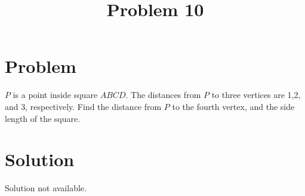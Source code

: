\documentclass{article}
\title{Problem 10}
\date{}
\begin{document}
\maketitle

\section*{Problem}
\(P\) is a point inside square \(A B C D\). The distances from \(P\) to three vertices are 1,2, and 3, respectively. Find the distance from \(P\) to the fourth vertex, and the side length of the square.

\section*{Solution}
Solution not available.
\end{document}
